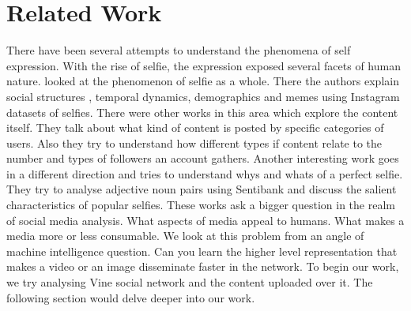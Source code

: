 \section{ Related Work }
There have been several attempts to understand the phenomena of self expression. With the rise of selfie, the expression exposed several facets of human nature. \cite{Souza2015} looked at the phenomenon of selfie as a whole. There the authors explain social structures , temporal dynamics, demographics and memes using Instagram datasets of selfies. There were other works in this area \cite{hu2014we} which explore the content itself. They talk about what kind of content is posted by specific categories of users. Also they try to understand how different types if content relate to the number and types of followers an account gathers. Another interesting work \cite{goodSelfie} goes in a different direction and tries to understand whys and whats of a perfect selfie. They try to analyse adjective noun pairs using Sentibank \cite{SentiBank} and discuss the salient characteristics of popular selfies. These works ask a bigger question in the realm of social media analysis. What aspects of media appeal to humans. What makes a media more or less consumable. We look at this problem from an angle of machine intelligence question. Can you learn the higher level representation that makes a video or an image disseminate faster in the network. To begin our work, we try analysing Vine social network and the content uploaded over it. The following section would delve deeper into our work.